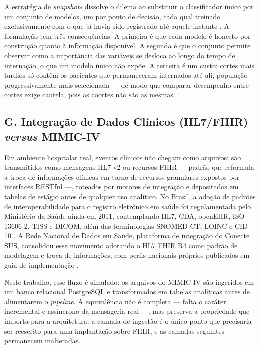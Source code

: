 \documentclass{ieeeaccess}
\begin{document}
A estratégia de \textit{snapshots} dissolve o dilema ao substituir o classificador único por um conjunto de modelos, um por ponto de decisão, cada qual treinado exclusivamente com o que já havia sido registrado até aquele instante \cite{King2022}. A formulação tem três consequências. A primeira é que cada modelo é honesto por construção quanto à informação disponível. A segunda é que o conjunto permite observar como a importância das variáveis se desloca ao longo do tempo de internação, o que um modelo único não expõe. A terceira é um custo: cortes mais tardios só contêm os pacientes que permaneceram internados até ali, população progressivamente mais selecionada --- de modo que comparar desempenho entre cortes exige cautela, pois as coortes não são as mesmas.

\subsection*{G. Integração de Dados Clínicos (HL7/FHIR) \textit{versus} MIMIC-IV}
Em ambiente hospitalar real, eventos clínicos não chegam como arquivos: são transmitidos como mensagens HL7 v2 ou recursos FHIR --- padrão que reformula a troca de informações clínicas em torno de recursos granulares expostos por interfaces RESTful \cite{Bender2013} ---, roteados por motores de integração e depositados em tabelas de estágio antes de qualquer uso analítico. No Brasil, a adoção de padrões de interoperabilidade para o registro eletrônico em saúde foi regulamentada pelo Ministério da Saúde ainda em 2011, contemplando HL7, CDA, openEHR, ISO 13606-2, TISS e DICOM, além das terminologias SNOMED-CT, LOINC e CID-10 \cite{Araujo2014}. A Rede Nacional de Dados em Saúde, plataforma de integração do Conecte SUS, consolidou esse movimento adotando o HL7 FHIR R4 como padrão de modelagem e troca de informações, com perfis nacionais próprios publicados em guia de implementação \cite{RNDS2024}.

Neste trabalho, esse fluxo é simulado: os arquivos do MIMIC-IV são ingeridos em um banco relacional PostgreSQL e transformados em tabelas analíticas antes de alimentarem o \textit{pipeline}. A equivalência não é completa --- falta o caráter incremental e assíncrono da mensageria real \cite{Bender2013} ---, mas preserva a propriedade que importa para a arquitetura: a camada de ingestão é o único ponto que precisaria ser reescrito para uma implantação sobre FHIR, e as camadas seguintes permanecem inalteradas.


\end{document}
